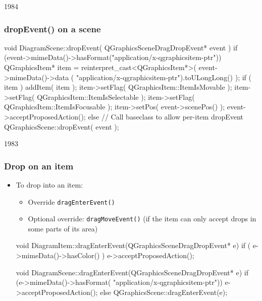 \begin{slide}[fragile]{1984}


\frametitle{dropEvent() on a scene}
\begin{cpp}
void DiagramScene::dropEvent( QGraphicsSceneDragDropEvent* event ) {
    if (event->mimeData()->hasFormat("application/x-qgraphicsitem-ptr")) {
         QGraphicsItem* item = reinterpret_cast<QGraphicsItem*>(
              event->mimeData()->data (
              "application/x-qgraphicsitem-ptr").toULongLong() );
         if ( item ) {
             addItem( item );
             item->setFlag( QGraphicsItem::ItemIsMovable );
             item->setFlag( QGraphicsItem::ItemIsSelectable );
             item->setFlag( QGraphicsItem::ItemIsFocusable );
             item->setPos( event->scenePos() );
             event->acceptProposedAction();
         }
    } else
        // Call baseclass to allow per-item dropEvent
        QGraphicsScene::dropEvent( event );
}
\end{cpp}
\end{slide}


\begin{slide}[fragile]{1983}


\frametitle{Drop on an item}
\begin{itemize}
\item To drop into an item:
    \begin{itemize}
    \item Override \texttt{dragEnterEvent()}
    \item Optional override: \texttt{dragMoveEvent()} 
       (if the item can only accept drops in some parts of its area)
    \end{itemize}

\begin{cpp}
void DiagramItem::dragEnterEvent(QGraphicsSceneDragDropEvent* e){
    if ( e->mimeData()->hasColor() )
        e->acceptProposedAction();
}

void DiagramScene::dragEnterEvent(QGraphicsSceneDragDropEvent* e){
     if (e->mimeData()->hasFormat(
     "application/x-qgraphicsitem-ptr"))
         e->acceptProposedAction();
     else
         QGraphicsScene::dragEnterEvent(e);
}
\end{cpp}
\end{itemize}
\end{slide}


